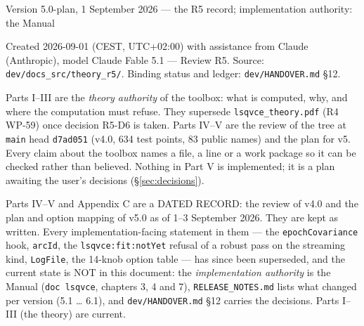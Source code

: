 \documentclass[11pt,a4paper,twoside,openany]{report}
\newcommand{\code}[1]{\texttt{#1}}
\begin{document}
\begin{titlepage}
{\large Version 5.0-plan, 1 September 2026 --- the R5 record; implementation authority: the Manual\par}
\vspace{3mm}
{Created 2026-09-01 (CEST, UTC+02:00) with assistance from Claude (Anthropic), model Claude Fable 5.1 --- Review R5. Source: \code{dev/docs\_src/theory\_r5/}. Binding status and ledger: \code{dev/HANDOVER.md} \S12.\par}
\vfill
\begin{principle}
Parts I--III are the \emph{theory authority} of the toolbox: what is computed, why, and where the computation must refuse. They supersede \code{lsqvce\_theory.pdf} (R4 WP-59) once decision R5-D6 is taken. Parts IV--V are the review of the tree at \code{main} head \code{d7ad051} (v4.0, 634 test points, 83 public names) and the plan for v5. Every claim about the toolbox names a file, a line or a work package so it can be checked rather than believed. Nothing in Part V is implemented; it is a plan awaiting the user's decisions (\S\ref{sec:decisions}).
\end{principle}
\begin{principle}
Parts IV--V and Appendix C are a DATED RECORD: the review of v4.0 and the plan and option mapping of v5.0 as of 1--3 September 2026. They are kept as written. Every implementation-facing statement in them --- the \code{epochCovariance} hook, \code{arcId}, the \code{lsqvce:fit:notYet} refusal of a robust pass on the streaming kind, \code{LogFile}, the 14-knob option table --- has since been superseded, and the current state is NOT in this document: the \emph{implementation authority} is the Manual (\code{doc lsqvce}, chapters 3, 4 and 7), \code{RELEASE\_NOTES.md} lists what changed per version (5.1 \ldots{} 6.1), and \code{dev/HANDOVER.md} \S12 carries the decisions. Parts I--III (the theory) are current.
\end{principle}
\end{titlepage}

\tableofcontents












\end{document}
